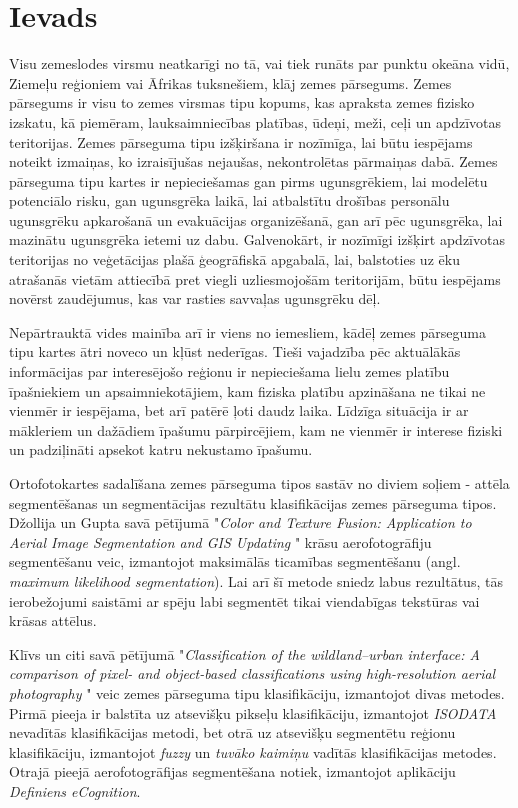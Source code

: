 \documentclass[12pt,paper=a4]{report}
\begin{document}
\chapter*{Ievads}
Visu zemeslodes virsmu neatkarīgi no tā, vai tiek runāts par punktu okeāna vidū, Ziemeļu reģioniem vai Āfrikas tuksnešiem, klāj zemes pārsegums. Zemes pārsegums ir visu to zemes virsmas tipu kopums, kas apraksta zemes fizisko izskatu, kā piemēram, lauksaimniecības platības, ūdeņi, meži, ceļi un apdzīvotas teritorijas. Zemes pārseguma tipu izšķiršana ir nozīmīga, lai būtu iespējams noteikt izmaiņas, ko izraisījušas nejaušas, nekontrolētas pārmaiņas dabā. \cite{landCoverTypes1976} Zemes pārseguma tipu kartes ir nepieciešamas gan pirms ugunsgrēkiem, lai modelētu potenciālo risku, gan ugunsgrēka laikā, lai atbalstītu drošības personālu ugunsgrēku apkarošanā un evakuācijas organizēšanā, gan arī pēc ugunsgrēka, lai mazinātu ugunsgrēka ietemi uz dabu. Galvenokārt, ir nozīmīgi izšķirt apdzīvotas teritorijas no veģetācijas plašā ģeogrāfiskā apgabalā, lai, balstoties uz ēku atrašanās vietām attiecībā pret viegli uzliesmojošām teritorijām, būtu iespējams novērst zaudējumus, kas var rasties savvaļas ugunsgrēku dēļ. \cite{cleve2008classification}\par
Nepārtrauktā vides mainība arī ir viens no iemesliem, kādēļ zemes pārseguma tipu kartes ātri noveco un kļūst nederīgas. Tieši vajadzība pēc aktuālākās informācijas par interesējošo reģionu ir nepieciešama lielu zemes platību īpašniekiem un apsaimniekotājiem, kam fiziska platību apzināšana ne tikai ne vienmēr ir iespējama, bet arī patērē ļoti daudz laika. Līdzīga situācija ir ar mākleriem un dažādiem īpašumu pārpircējiem, kam ne vienmēr ir interese fiziski un padziļināti apsekot katru nekustamo īpašumu. \par
Ortofotokartes sadalīšana zemes pārseguma tipos sastāv no diviem soļiem - attēla segmentēšanas un segmentācijas rezultātu klasifikācijas zemes pārseguma tipos. Džollija un Gupta savā pētījumā "\textit{Color and Texture Fusion: Application to Aerial Image Segmentation and GIS Updating} \cite{jolly1996color}" krāsu aerofotogrāfiju segmentēšanu veic, izmantojot maksimālās ticamības segmentēšanu (angl. \textit{maximum likelihood segmentation}). Lai arī šī metode sniedz labus rezultātus, tās ierobežojumi saistāmi ar spēju labi segmentēt tikai viendabīgas tekstūras vai krāsas attēlus. \cite{jolly1996color} \par
Klīvs un citi savā pētījumā "\textit{Classification of the wildland–urban interface: A comparison of pixel- and object-based classifications using high-resolution aerial photography} \cite{cleve2008classification}" veic zemes pārseguma tipu klasifikāciju, izmantojot divas metodes. Pirmā pieeja ir balstīta uz atsevišķu pikseļu klasifikāciju, izmantojot \textit{ISODATA} nevadītās klasifikācijas metodi, bet otrā uz atsevišķu segmentētu reģionu klasifikāciju, izmantojot \textit{fuzzy} un \textit{tuvāko kaimiņu} vadītās klasifikācijas metodes. Otrajā pieejā aerofotogrāfijas segmentēšana notiek, izmantojot aplikāciju \textit{Definiens eCognition}. \cite{cleve2008classification} \par
\end{document}
